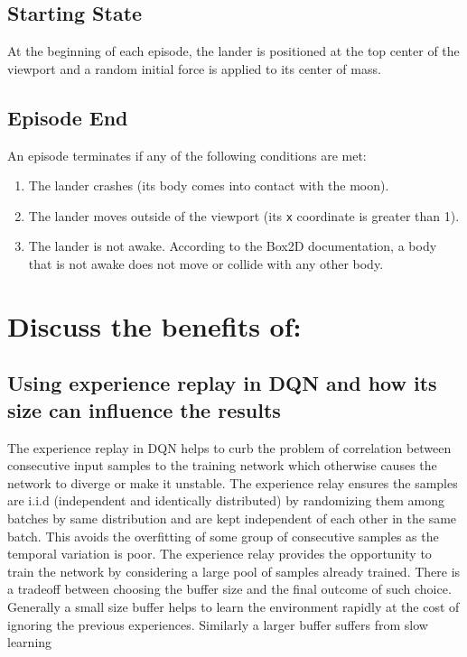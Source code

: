 \documentclass{article} %
\begin{document}
\subsection{Starting State}
At the beginning of each episode, the lander is positioned at the top center of the viewport and a random initial force is applied to its center of mass.


\subsection{Episode End}
An episode terminates if any of the following conditions are met: \begin{enumerate} \item The lander crashes (its body comes into contact with the moon). \item The lander moves outside of the viewport (its \verb|x| coordinate is greater than 1). \item The lander is not awake. According to the Box2D documentation, a body that is not awake does not move or collide with any other body. \end{enumerate}

\section{Discuss the benefits of:}
\subsection{Using experience replay in DQN and how its size can influence the results}

The experience replay in DQN helps to curb the problem of correlation between consecutive input samples to the training network which otherwise causes the network to diverge or make it unstable. The experience relay ensures the samples are i.i.d (independent and identically distributed) by randomizing them among batches by same distribution and are kept independent of each other in the same batch. This avoids the overfitting of some group of consecutive samples as the temporal variation is poor. 
The experience relay provides the opportunity to train the network by considering a large pool of samples already trained. There is a tradeoff between choosing the buffer size and the final outcome of such choice. Generally a small size buffer helps to learn the environment rapidly at the cost of ignoring the previous experiences. Similarly a larger buffer suffers from slow learning 
\end{document}
